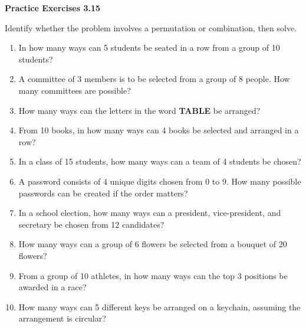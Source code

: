 \vspace{0.3ex}
\noindent\textbf{Practice Exercises 3.15}

\vspace{0.2ex}

Identify whether the problem involves a permutation or combination, then solve.

\begin{enumerate}[label=\color{blue}\arabic*.]
    \item In how many ways can 5 students be seated in a row from a group of 10 students?
    \item A committee of 3 members is to be selected from a group of 8 people. How many committees are possible?
    \item How many ways can the letters in the word \textbf{TABLE} be arranged?
    \item From 10 books, in how many ways can 4 books be selected and arranged in a row?
    \item In a class of 15 students, how many ways can a team of 4 students be chosen?
    \item A password consists of 4 unique digits chosen from 0 to 9. How many possible passwords can be created if the order matters?
    \item In a school election, how many ways can a president, vice-president, and secretary be chosen from 12 candidates?
    \item How many ways can a group of 6 flowers be selected from a bouquet of 20 flowers?
    \item From a group of 10 athletes, in how many ways can the top 3 positions be awarded in a race?
    \item How many ways can 5 different keys be arranged on a keychain, assuming the arrangement is circular?
\end{enumerate}
